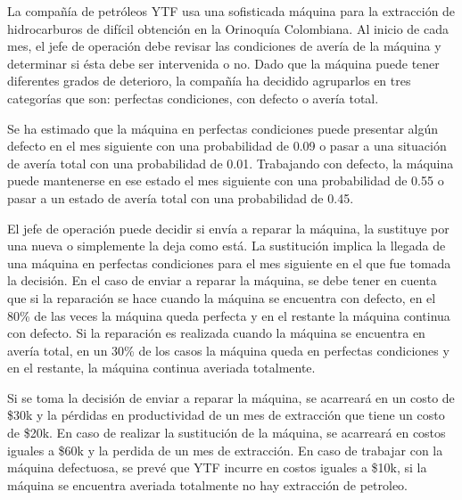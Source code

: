 \noindent La compañía de  petróleos YTF usa una sofisticada máquina para la extracción de hidrocarburos de difícil obtención en la Orinoquía Colombiana. Al inicio de cada mes, el jefe de operación debe revisar las condiciones de avería de la máquina y determinar si ésta debe ser intervenida o no. Dado que la máquina puede tener diferentes grados de deterioro, la compañía  ha decidido agruparlos en tres categorías que son: perfectas condiciones, con defecto o avería total. 

\noindent Se ha estimado que la máquina en perfectas condiciones puede presentar algún defecto en el mes siguiente con una probabilidad de 0.09 o pasar a una situación de avería total con una probabilidad de 0.01. Trabajando con defecto, la máquina puede mantenerse en ese estado el mes siguiente con una probabilidad de 0.55 o pasar a un estado de avería total con una probabilidad de 0.45. 

\noindent El jefe de operación puede decidir si envía a reparar la máquina, la sustituye por una nueva o simplemente la deja como está. La sustitución implica la llegada de una máquina en perfectas condiciones para el mes siguiente en el que fue tomada la decisión. En el caso de enviar a reparar la máquina, se debe tener en cuenta que si la reparación se hace cuando la máquina se encuentra con defecto, en el 80\% de las veces la máquina queda perfecta y en el restante la máquina continua con defecto. Si la reparación es realizada cuando la máquina se encuentra en avería total, en un 30\% de los casos la máquina queda en perfectas condiciones y en el restante, la máquina continua averiada totalmente. 

\noindent Si se toma la decisión de enviar a reparar la máquina, se acarreará en un costo de \$30k y la pérdidas en productividad  de un mes de extracción que tiene un costo de \$20k. En caso de realizar la sustitución de la máquina, se acarreará en costos iguales a \$60k y la perdida de un mes de extracción. En caso de trabajar con la máquina defectuosa, se prevé que YTF incurre en costos iguales a \$10k, si la máquina se encuentra averiada totalmente no hay extracción de petroleo.

